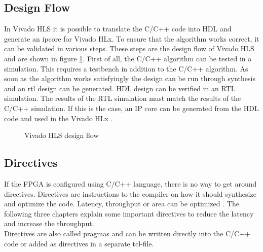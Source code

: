\subsection{Design Flow} \label{ch:design_flow}
In Vivado HLS it is possible to translate the C/C++ code into HDL and generate
an \gls{ipcore} for Vivado HLx. To ensure that the algorithm works correct, it
can be validated in various steps. These steps are the design flow of Vivado HLS and are shown in figure \ref{fig:hls_design_flow}.
First of all, the C/C++ algorithm can be tested in a simulation. This requires a
testbench in addition to the C/C++ algorithm. As soon as the algorithm works
satisfyingly the design can be run through synthesis and an \gls{rtl} design can
be
generated. HDL design can be verified in an RTL simulation. The results of the
RTL
simulation must match the results of the C/C++ simulation. If this is the case,
an IP core can be generated from the HDL code and used in the Vivado HLx \cite{vivado_hls}.

\begin{figure}[tb!]
    \centering
    
    \caption{Vivado HLS design flow}
    \label{fig:hls_design_flow}
\end{figure}

\subsection{Directives} \label{ch:directives}
If the FPGA is configured using C/C++ language, there is no way to get around directives. Directives are instructions to the compiler on how it should synthesize and optimize the code. Latency, throughput or area can be optimized \cite{pragma}. The following three chapters explain some important directives to reduce the latency and increase the throughput. \\
Directives are also called pragmas and can be written directly into the C/C++ code or added as directives in a separate tcl-file.

